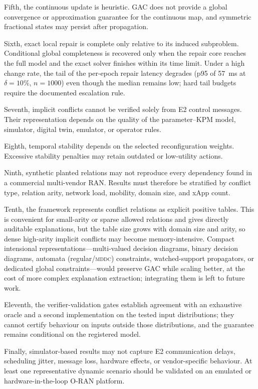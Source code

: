 \documentclass[pdflatex,sn-mathphys-num,iicol,oneside]{sn-jnl}
\begin{document}
Fifth, the continuous update is heuristic. GAC does not provide a
global convergence or approximation guarantee for the continuous map,
and symmetric fractional states may persist after propagation.

Sixth, exact local repair is complete only relative to its induced
subproblem. Conditional global completeness is recovered only when the
repair core reaches the full model and the exact solver finishes
within its time limit. Under a high change rate, the tail of the
per-epoch repair latency degrades (p95 of 57~ms at $\delta=10\%$,
$n=1000$) even though the median remains low; hard tail budgets
require the documented escalation rule.

Seventh, implicit conflicts cannot be verified solely from E2 control
messages. Their representation depends on the quality of the
parameter--KPM model, simulator, digital twin, emulator, or operator
rules.

Eighth, temporal stability depends on the selected reconfiguration
weights. Excessive stability penalties may retain outdated or
low-utility actions.

Ninth, synthetic planted relations may not reproduce every dependency
found in a commercial multi-vendor RAN. Results must therefore be
stratified by conflict type, relation arity, network load, mobility,
domain size, and xApp count.

Tenth, the framework represents conflict relations as explicit
positive tables. This is convenient for small-arity or sparse allowed
relations and gives directly auditable explanations, but the table
size grows with domain size and arity, so dense high-arity implicit
conflicts may become memory-intensive. Compact intensional
representations---multi-valued decision diagrams, binary decision
diagrams, automata (regular/\textsc{mddc}) constraints, watched-support
propagators, or dedicated global constraints---would preserve GAC while
scaling better, at the cost of more complex explanation extraction;
integrating them is left to future work.

Eleventh, the verifier-validation gates establish agreement with an
exhaustive oracle and a second implementation on the tested input
distributions; they cannot certify behaviour on inputs outside those
distributions, and the guarantee remains conditional on the registered
model.

Finally, simulator-based results may not capture E2 communication
delays, scheduling jitter, message loss, hardware effects, or
vendor-specific behaviour. At least one representative dynamic
scenario should be validated on an emulated or hardware-in-the-loop
O-RAN platform.
\end{document}
